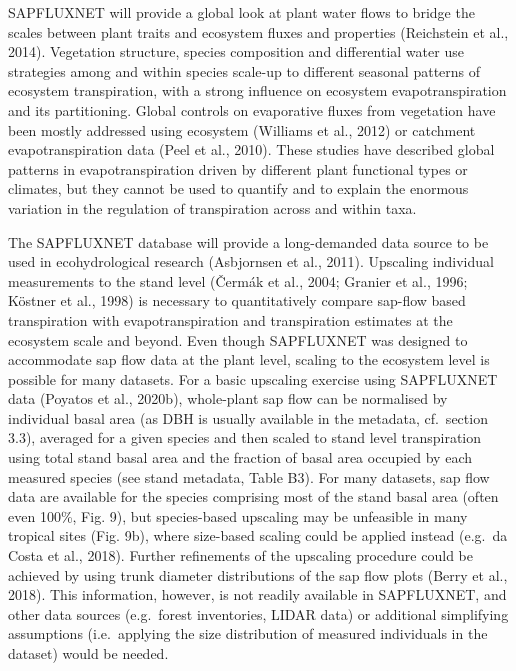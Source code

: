 \documentclass[11pt,twoside]{reedthesis}
\begin{document}
SAPFLUXNET will provide a global look at plant water flows to bridge the
scales between plant traits and ecosystem fluxes and properties
(Reichstein et al., 2014). Vegetation structure, species composition and
differential water use strategies among and within species scale-up to
different seasonal patterns of ecosystem transpiration, with a strong
influence on ecosystem evapotranspiration and its partitioning. Global
controls on evaporative fluxes from vegetation have been mostly
addressed using ecosystem (Williams et al., 2012) or catchment
evapotranspiration data (Peel et al., 2010). These studies have
described global patterns in evapotranspiration driven by different
plant functional types or climates, but they cannot be used to quantify
and to explain the enormous variation in the regulation of transpiration
across and within taxa.\par

The SAPFLUXNET database will provide a long-demanded data source to be
used in ecohydrological research (Asbjornsen et al., 2011). Upscaling
individual measurements to the stand level (Čermák et al., 2004; Granier
et al., 1996; Köstner et al., 1998) is necessary to quantitatively
compare sap-flow based transpiration with evapotranspiration and
transpiration estimates at the ecosystem scale and beyond. Even though
SAPFLUXNET was designed to accommodate sap flow data at the plant level,
scaling to the ecosystem level is possible for many datasets. For a
basic upscaling exercise using SAPFLUXNET data (Poyatos et al., 2020b),
whole-plant sap flow can be normalised by individual basal area (as DBH
is usually available in the metadata, cf.~section 3.3), averaged for a
given species and then scaled to stand level transpiration using total
stand basal area and the fraction of basal area occupied by each
measured species (see stand metadata, Table B3). For many datasets, sap
flow data are available for the species comprising most of the stand
basal area (often even 100\%, Fig. 9), but species-based upscaling may
be unfeasible in many tropical sites (Fig. 9b), where size-based scaling
could be applied instead (e.g.~da Costa et al., 2018). Further
refinements of the upscaling procedure could be achieved by using trunk
diameter distributions of the sap flow plots (Berry et al., 2018). This
information, however, is not readily available in SAPFLUXNET, and other
data sources (e.g.~forest inventories, LIDAR data) or additional
simplifying assumptions (i.e.~applying the size distribution of measured
individuals in the dataset) would be needed.\par
\end{document}
